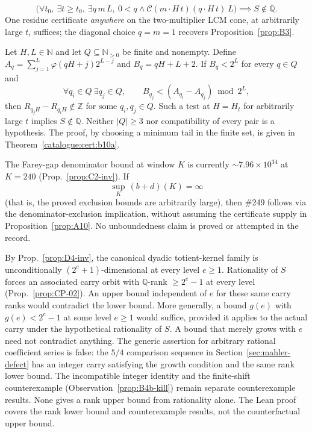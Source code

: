 \begin{prop}\label{prop:B7}
\[
\big(\forall t_0,\ \exists t\ge t_0,\ \exists q\,m\,L,\ 0<q \wedge \mathcal{C}(m\cdot{H}\,t)(q\cdot{H}\,t)\ L\big)
\implies S\notin\mathbb Q.
\]
One residue certificate \emph{anywhere} on the two-multiplier LCM cone, at arbitrarily large $t$,
suffices; the diagonal choice $q=m=1$ recovers Proposition~\ref{prop:B3}.
\end{prop}


\begin{prop}\label{prop:B10}
Let $H,L\in\mathbb N$ and let $Q\subseteq\mathbb N_{>0}$ be finite and
nonempty. Define $A_q=\sum_{j=1}^{L}\varphi(qH+j)2^{L-j}$ and
$B_q=qH+L+2$. If $B_q<2^L$ for every $q\in Q$ and
\[
 \forall q_i\in Q\ \exists q_j\in Q,\qquad
 B_{q_j}<(A_{q_i}-A_{q_j})\bmod2^L,
\]
then $R_{q_jH}-R_{q_iH}\notin\mathbb Z$ for some $q_i,q_j\in Q$.
Such a test at $H=H_t$ for arbitrarily large $t$ implies
$S\notin\mathbb Q$. Neither $|Q|\ge3$ nor compatibility of every
pair is a hypothesis. The proof, by choosing a minimum tail in the
finite set, is given in Theorem~\ref{catalogue:cert:b10a}.
\end{prop}

\begin{prop}\label{prop:C2sup}
The Farey-gap denominator bound at window $K$ is currently $\sim 7.96\times10^{34}$ at $K=240$
(Prop.~\ref{prop:C2-inv}). If
\[
\sup_K\, (b+d)(K) = \infty
\]
(that is, the proved exclusion bounds are arbitrarily large), then \#249 follows via the denominator-exclusion implication, without assuming the certificate supply in Proposition~\ref{prop:A10}. No unboundedness claim is proved or attempted in the record.
\end{prop}

\begin{prop}\label{prop:D5cons}
By Prop.~\ref{prop:D4-inv}, the canonical dyadic totient-kernel family is unconditionally
$(2^e+1)$-dimensional at every level $e\ge1$. Rationality of $S$ forces an associated
carry orbit with $\mathbb Q$-rank $\ge 2^e-1$ at every level (Prop.~\ref{prop:CP-02}). An upper bound independent of $e$ for these same carry ranks would
contradict the lower bound. More generally, a bound $g(e)$ with
$g(e)<2^e-1$ at some level $e\ge1$ would suffice, provided it applies to the
actual carry under the hypothetical rationality of $S$. A bound that
merely grows with $e$ need not contradict anything. The generic assertion
for arbitrary rational coefficient series is false: the $5/4$ comparison
sequence in Section~\ref{sec:mahler-defect} has an integer carry satisfying
the growth condition and the same rank lower bound. The incompatible
integer identity and the finite-shift counterexample (Observation~\ref{prop:B4b-kill}) remain
separate counterexample results. None gives a rank upper bound from rationality alone.
The Lean proof covers the rank lower bound and counterexample results,
not the counterfactual upper bound.
\end{prop}

